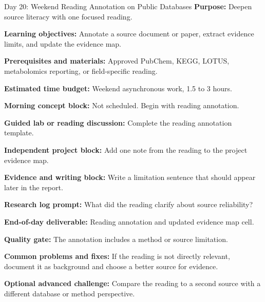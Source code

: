 \begin{dailybox}{Day 20: Weekend Reading Annotation on Public Databases}
\textbf{Purpose:} Deepen source literacy with one focused reading.

\textbf{Learning objectives:} Annotate a source document or paper, extract evidence limits, and update the evidence map.

\textbf{Prerequisites and materials:} Approved PubChem, KEGG, LOTUS, metabolomics reporting, or field-specific reading.

\textbf{Estimated time budget:} Weekend asynchronous work, 1.5 to 3 hours.

\textbf{Morning concept block:} Not scheduled. Begin with reading annotation.

\textbf{Guided lab or reading discussion:} Complete the reading annotation template.

\textbf{Independent project block:} Add one note from the reading to the project evidence map.

\textbf{Evidence and writing block:} Write a limitation sentence that should appear later in the report.

\textbf{Research log prompt:} What did the reading clarify about source reliability?

\textbf{End-of-day deliverable:} Reading annotation and updated evidence map cell.

\textbf{Quality gate:} The annotation includes a method or source limitation.

\textbf{Common problems and fixes:} If the reading is not directly relevant, document it as background and choose a better source for evidence.

\textbf{Optional advanced challenge:} Compare the reading to a second source with a different database or method perspective.
\end{dailybox}

